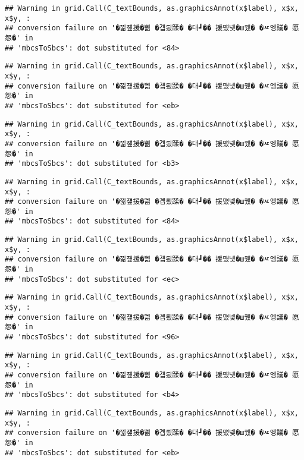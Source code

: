 \documentclass[
]{article}
\begin{document}
\begin{verbatim}
## Warning in grid.Call(C_textBounds, as.graphicsAnnot(x$label), x$x, x$y, :
## conversion failure on '�낆쟾援�쁾 �곕룄蹂� �대┛�� 援먰넻�ш퀬� �ㅼ엥議� 愿怨�' in
## 'mbcsToSbcs': dot substituted for <84>
\end{verbatim}

\begin{verbatim}
## Warning in grid.Call(C_textBounds, as.graphicsAnnot(x$label), x$x, x$y, :
## conversion failure on '�낆쟾援�쁾 �곕룄蹂� �대┛�� 援먰넻�ш퀬� �ㅼ엥議� 愿怨�' in
## 'mbcsToSbcs': dot substituted for <eb>
\end{verbatim}

\begin{verbatim}
## Warning in grid.Call(C_textBounds, as.graphicsAnnot(x$label), x$x, x$y, :
## conversion failure on '�낆쟾援�쁾 �곕룄蹂� �대┛�� 援먰넻�ш퀬� �ㅼ엥議� 愿怨�' in
## 'mbcsToSbcs': dot substituted for <b3>
\end{verbatim}

\begin{verbatim}
## Warning in grid.Call(C_textBounds, as.graphicsAnnot(x$label), x$x, x$y, :
## conversion failure on '�낆쟾援�쁾 �곕룄蹂� �대┛�� 援먰넻�ш퀬� �ㅼ엥議� 愿怨�' in
## 'mbcsToSbcs': dot substituted for <84>
\end{verbatim}

\begin{verbatim}
## Warning in grid.Call(C_textBounds, as.graphicsAnnot(x$label), x$x, x$y, :
## conversion failure on '�낆쟾援�쁾 �곕룄蹂� �대┛�� 援먰넻�ш퀬� �ㅼ엥議� 愿怨�' in
## 'mbcsToSbcs': dot substituted for <ec>
\end{verbatim}

\begin{verbatim}
## Warning in grid.Call(C_textBounds, as.graphicsAnnot(x$label), x$x, x$y, :
## conversion failure on '�낆쟾援�쁾 �곕룄蹂� �대┛�� 援먰넻�ш퀬� �ㅼ엥議� 愿怨�' in
## 'mbcsToSbcs': dot substituted for <96>
\end{verbatim}

\begin{verbatim}
## Warning in grid.Call(C_textBounds, as.graphicsAnnot(x$label), x$x, x$y, :
## conversion failure on '�낆쟾援�쁾 �곕룄蹂� �대┛�� 援먰넻�ш퀬� �ㅼ엥議� 愿怨�' in
## 'mbcsToSbcs': dot substituted for <b4>
\end{verbatim}

\begin{verbatim}
## Warning in grid.Call(C_textBounds, as.graphicsAnnot(x$label), x$x, x$y, :
## conversion failure on '�낆쟾援�쁾 �곕룄蹂� �대┛�� 援먰넻�ш퀬� �ㅼ엥議� 愿怨�' in
## 'mbcsToSbcs': dot substituted for <eb>
\end{verbatim}
\end{document}
